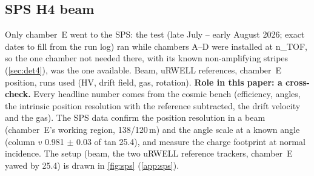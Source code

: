 \subsection{SPS H4 beam}
Only chamber~E went to the SPS: the test (late July -- early August 2026; exact dates to fill from the run log) ran while chambers A--D were installed at
n\_TOF, so the one chamber not needed there, with its known non-amplifying stripes (\cref{sec:det4}), was the one
available. Beam, uRWELL references, chamber~E position, runs used (HV, drift field, gas, rotation).
\textbf{Role in this paper: a cross-check.} Every headline number comes from the cosmic bench (efficiency, angles,
the intrinsic position resolution with the reference subtracted, the drift velocity and the gas). The SPS data confirm
the position resolution in a beam (chamber~E's working region, 138/120\,\textmu m) and the angle scale at a known angle
(column $v$ 0.981 $\pm$ 0.03 of tan 25.4\textdegree), and measure the charge footprint at normal incidence.
The setup (beam, the two uRWELL reference trackers, chamber~E yawed by 25.4\textdegree{}) is drawn in \cref{fig:sps} (\cref{app:sps}).

